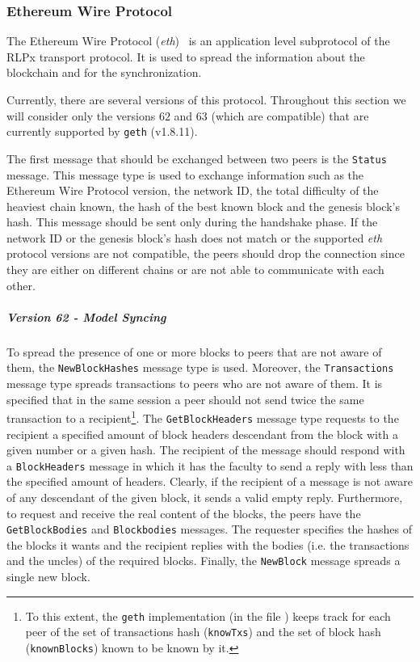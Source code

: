 \subsubsection{Ethereum Wire Protocol}
\label{sec:ethereum-wire-protocol}

The Ethereum Wire Protocol (\emph{eth})~\cite{bib:ethereumwireprotocol} is an
application level subprotocol of the RLPx transport protocol. It is used to
spread the information about the blockchain and for the synchronization.

Currently, there are several versions of this protocol. Throughout this section
we will consider only the versions $62$ and $63$ (which are compatible) that are
currently supported by \texttt{geth} (v1.8.11).

The first message that should be exchanged between two peers is the
\texttt{Status} message. This message type is used to exchange information such
as the Ethereum Wire Protocol version, the network ID, the total difficulty of
the heaviest chain known, the hash of the best known block and the genesis
block's hash. This message should be sent only during the handshake phase. If
the network ID or the genesis block's hash does not match or the supported
\emph{eth} protocol versions are not compatible, the peers should drop the
connection since they are either on different chains or are not able to
communicate with each other.

\subparagraph{Version 62 - Model Syncing}
\label{sec:normal-sync}
To spread the presence of one or more blocks to peers that are not aware of
them, the \texttt{NewBlockHashes} message type is used. Moreover, the
\texttt{Transactions} message type spreads transactions to peers who are not
aware of them. It is specified that in the same session a peer should not send
twice the same transaction to a recipient\footnote{To this extent, the
\texttt{geth} implementation (in the file ) keeps track for
each peer of the set of transactions hash (\texttt{knowTxs}) and the set of
block hash (\texttt{knownBlocks}) known to be known by it.}. The
\texttt{GetBlockHeaders} message type requests to the recipient a specified
amount of block headers descendant from the block with a given number or a given
hash. The recipient of the message should respond with a \texttt{BlockHeaders}
message in which it has the faculty to send a reply with less than the specified
amount of headers. Clearly, if the recipient of a message is not aware of any
descendant of the given block, it sends a valid empty reply. Furthermore, to
request and receive the real content of the blocks, the peers have the
\texttt{GetBlockBodies} and \texttt{Blockbodies} messages. The requester
specifies the hashes of the blocks it wants and the recipient replies with the
bodies (i.e. the transactions and the uncles) of the required blocks. Finally,
the \texttt{NewBlock} message spreads a single new block.

